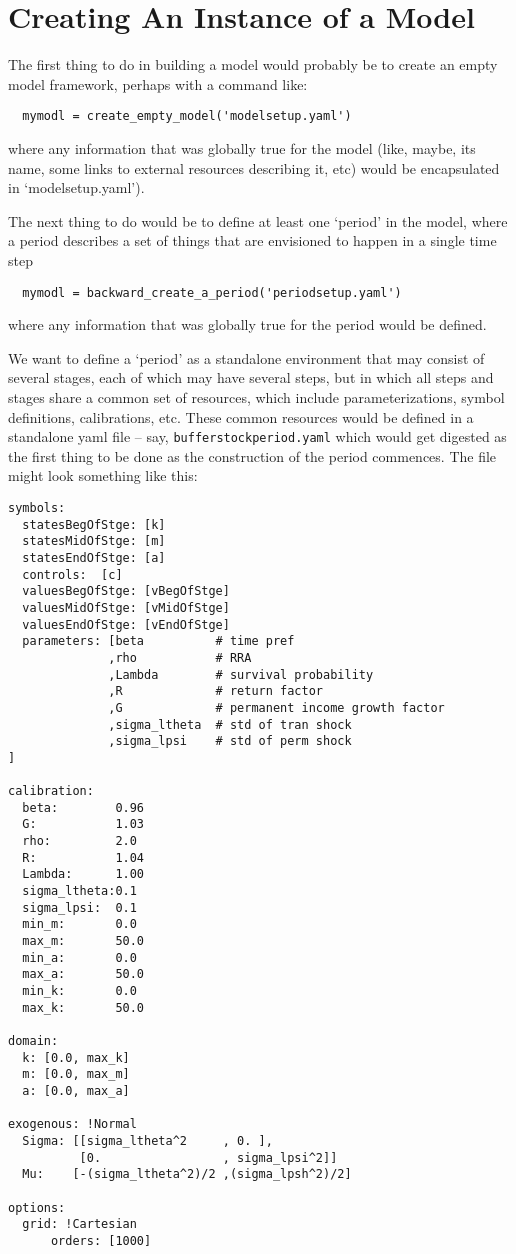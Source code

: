 \documentclass[SolvingMicroDSOPs]{subfiles}
\begin{document}
\section{Creating An Instance of a Model}

The first thing to do in building a model would probably be to create an empty model framework, perhaps with a command like:

\begin{verbatim}
  mymodl = create_empty_model('modelsetup.yaml')
\end{verbatim}
where any information that was globally true for the model (like, maybe, its name, some links to external resources describing it, etc) would be encapsulated in `modelsetup.yaml').

The next thing to do would be to define at least one `period' in the model, where a period describes a set of things that are envisioned to happen in a single time step
\begin{verbatim}
  mymodl = backward_create_a_period('periodsetup.yaml')
\end{verbatim}
where any information that was globally true for the period would be defined.

We want to define a `period' as a standalone environment that may consist of several stages, each of which may have several steps, but in which all steps and stages share a common set of resources, which include parameterizations, symbol definitions, calibrations, etc.  These common resources would be defined in a standalone yaml file -- say, \texttt{bufferstockperiod.yaml} which would get digested as the first thing to be done as the construction of the period commences.  The file might look something like this:

\begin{verbatim}
symbols:
  statesBegOfStge: [k]
  statesMidOfStge: [m]
  statesEndOfStge: [a]
  controls:  [c]
  valuesBegOfStge: [vBegOfStge]
  valuesMidOfStge: [vMidOfStge]
  valuesEndOfStge: [vEndOfStge]
  parameters: [beta          # time pref
              ,rho           # RRA
              ,Lambda        # survival probability
              ,R             # return factor
              ,G             # permanent income growth factor 
              ,sigma_ltheta  # std of tran shock
              ,sigma_lpsi    # std of perm shock 
]

calibration:
  beta:        0.96
  G:           1.03
  rho:         2.0
  R:           1.04
  Lambda:      1.00
  sigma_ltheta:0.1
  sigma_lpsi:  0.1
  min_m:       0.0
  max_m:       50.0
  min_a:       0.0
  max_a:       50.0
  min_k:       0.0
  max_k:       50.0

domain:
  k: [0.0, max_k]
  m: [0.0, max_m]
  a: [0.0, max_a]

exogenous: !Normal
  Sigma: [[sigma_ltheta^2     , 0. ],
          [0.                 , sigma_lpsi^2]]
  Mu:    [-(sigma_ltheta^2)/2 ,(sigma_lpsh^2)/2]

options:
  grid: !Cartesian
      orders: [1000]
\end{verbatim}
\end{document}
